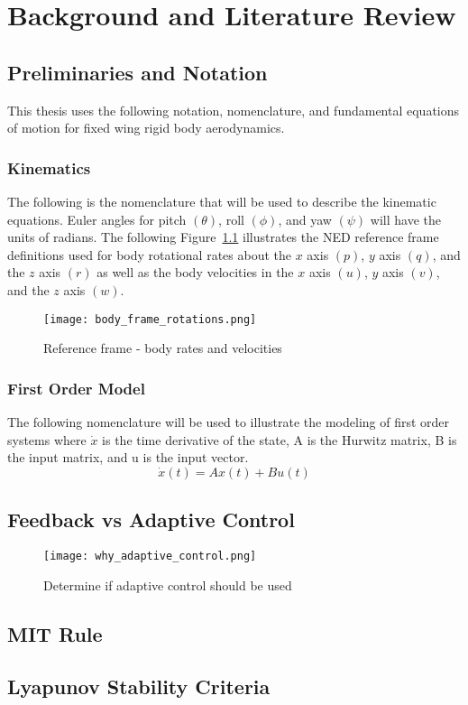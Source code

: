 \chapter{Background and Literature Review}\label{ch:problem}
\section{Preliminaries and Notation}\label{preliminaries}
This thesis uses the following notation, nomenclature, and fundamental equations of motion for fixed wing rigid body aerodynamics.

\subsection{Kinematics}
The following is the nomenclature that will be used to describe the kinematic equations.  Euler angles for pitch $(\theta)$, roll $(\phi)$, and yaw $(\psi)$ will have the units of radians.  The following Figure~\ref{fig:reference_frame} illustrates the \ac{NED} reference frame definitions used for body rotational rates about the $x$ axis $(p)$, $y$ axis $(q)$, and the $z$ axis $(r)$ as well as the body velocities in the $x$ axis $(u)$, $y$ axis $(v)$, and the $z$ axis $(w)$.

\begin{figure}[h!]
 \centering
  \texttt{[image: body\_frame\_rotations.png]}
  \caption{Reference frame - body rates and velocities}
  \label{fig:reference_frame}
\end{figure}

\subsection{First Order Model}
The following nomenclature will be used to illustrate the modeling of first order systems where $\dot{x}$ is the time derivative of the state, A is the Hurwitz matrix, B is the input matrix, and u is the input vector.
\begin{equation}
\dot{x}(t)=Ax(t)+Bu(t)
\end{equation}


\section{Feedback vs Adaptive Control}

\begin{figure}[h!]
 \centering
  \texttt{[image: why\_adaptive\_control.png]}
  \caption{Determine if adaptive control should be used}
  \label{fig:why_adaptive_control}
\end{figure}


\section{MIT Rule}


\section{Lyapunov Stability Criteria}




